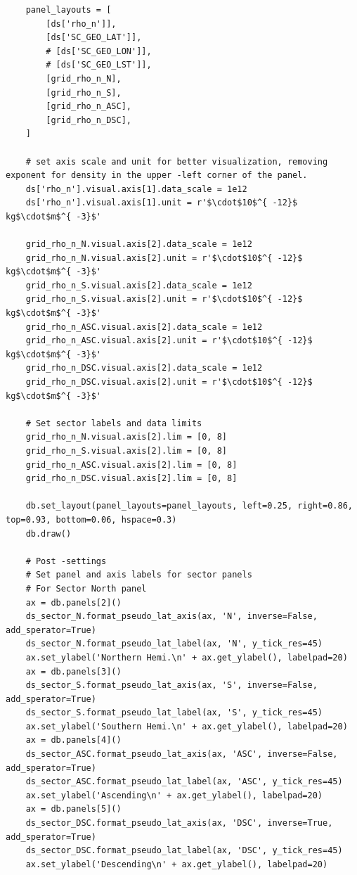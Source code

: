 \begin{verbatim}
    panel_layouts = [
        [ds['rho_n']],
        [ds['SC_GEO_LAT']],
        # [ds['SC_GEO_LON']],
        # [ds['SC_GEO_LST']],
        [grid_rho_n_N],
        [grid_rho_n_S],
        [grid_rho_n_ASC],
        [grid_rho_n_DSC],
    ]
    
    # set axis scale and unit for better visualization, removing exponent for density in the upper -left corner of the panel.
    ds['rho_n'].visual.axis[1].data_scale = 1e12 
    ds['rho_n'].visual.axis[1].unit = r'$\cdot$10$^{ -12}$ kg$\cdot$m$^{ -3}$'
    
    grid_rho_n_N.visual.axis[2].data_scale = 1e12
    grid_rho_n_N.visual.axis[2].unit = r'$\cdot$10$^{ -12}$ kg$\cdot$m$^{ -3}$'
    grid_rho_n_S.visual.axis[2].data_scale = 1e12
    grid_rho_n_S.visual.axis[2].unit = r'$\cdot$10$^{ -12}$ kg$\cdot$m$^{ -3}$'
    grid_rho_n_ASC.visual.axis[2].data_scale = 1e12
    grid_rho_n_ASC.visual.axis[2].unit = r'$\cdot$10$^{ -12}$ kg$\cdot$m$^{ -3}$'
    grid_rho_n_DSC.visual.axis[2].data_scale = 1e12
    grid_rho_n_DSC.visual.axis[2].unit = r'$\cdot$10$^{ -12}$ kg$\cdot$m$^{ -3}$'
    
    # Set sector labels and data limits
    grid_rho_n_N.visual.axis[2].lim = [0, 8]
    grid_rho_n_S.visual.axis[2].lim = [0, 8]
    grid_rho_n_ASC.visual.axis[2].lim = [0, 8]
    grid_rho_n_DSC.visual.axis[2].lim = [0, 8]
    
    db.set_layout(panel_layouts=panel_layouts, left=0.25, right=0.86, top=0.93, bottom=0.06, hspace=0.3)
    db.draw()
    
    # Post -settings
    # Set panel and axis labels for sector panels
    # For Sector North panel
    ax = db.panels[2]()
    ds_sector_N.format_pseudo_lat_axis(ax, 'N', inverse=False, add_sperator=True)
    ds_sector_N.format_pseudo_lat_label(ax, 'N', y_tick_res=45)
    ax.set_ylabel('Northern Hemi.\n' + ax.get_ylabel(), labelpad=20)
    ax = db.panels[3]()
    ds_sector_S.format_pseudo_lat_axis(ax, 'S', inverse=False, add_sperator=True)
    ds_sector_S.format_pseudo_lat_label(ax, 'S', y_tick_res=45)
    ax.set_ylabel('Southern Hemi.\n' + ax.get_ylabel(), labelpad=20)
    ax = db.panels[4]()
    ds_sector_ASC.format_pseudo_lat_axis(ax, 'ASC', inverse=False, add_sperator=True)
    ds_sector_ASC.format_pseudo_lat_label(ax, 'ASC', y_tick_res=45)
    ax.set_ylabel('Ascending\n' + ax.get_ylabel(), labelpad=20)
    ax = db.panels[5]()
    ds_sector_DSC.format_pseudo_lat_axis(ax, 'DSC', inverse=True, add_sperator=True)
    ds_sector_DSC.format_pseudo_lat_label(ax, 'DSC', y_tick_res=45)
    ax.set_ylabel('Descending\n' + ax.get_ylabel(), labelpad=20)
    

\end{verbatim}
